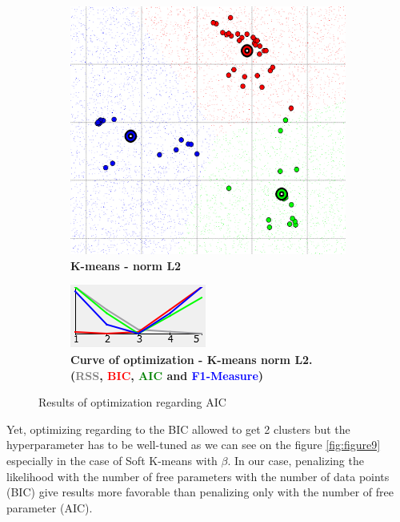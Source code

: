 \begin{figure} [ht]
\begin{subfigure}[t]{0.50\textwidth}
	\end{subfigure}\\
    \begin{subfigure}[t]{0.25\textwidth}
    \centering
    \includegraphics[height=0.15\textheight, right]{./clustering/opt_AIC_k_mean_L2_range5.png}
	\caption{\bf K-means - norm L2}
    \end{subfigure} 
    \hspace{20mm}
    \begin{subfigure}[t]{0.50\textwidth}
    \centering
    \includegraphics[height=0.15\textheight]{./clustering/curve_opt_AIC_k_mean_L2_range5.png}
	\caption{\bf Curve of optimization - K-means norm L2. (\textcolor{gray}{RSS}, \textcolor{red}{BIC}, \textcolor{green}{AIC} and \textcolor{blue}{F1-Measure})}
    \end{subfigure}
\caption{Results of optimization regarding AIC}
\label{fig:figure8}
\end{figure}

Yet, optimizing regarding to the BIC allowed to get 2 clusters but the hyperparameter has to be well-tuned as we can see on the figure \ref{fig:figure9} especially in the case of Soft K-means with $\beta$. In our case, penalizing the likelihood with the number of free parameters with the number of data points (BIC) give results more favorable than penalizing only with the number of free parameter (AIC). 

